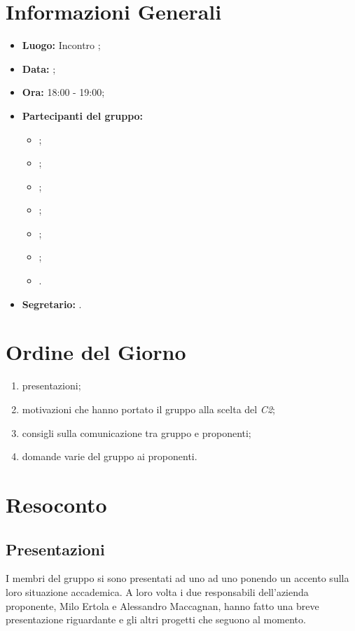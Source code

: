 \section{Informazioni Generali}
\begin{itemize}
\item \textbf{Luogo:} Incontro ;
\item \textbf{Data:} \Data;
\item \textbf{Ora:} 18:00 - 19:00;
\item \textbf{Partecipanti del gruppo:}
	\begin{itemize}
		\item \BL{}; 
		\item \FF{};
		\item \MM{}; 
		\item \PC{};
		\item \TG{};
		\item \TL{};
		\item \VD{}.
	\end{itemize} 
\item \textbf{Segretario:} \PC{}.
\end{itemize}

\section{Ordine del Giorno}
\begin{enumerate}
	\item presentazioni;
	\item motivazioni che hanno portato il gruppo {\Gruppo} alla scelta del  \textit{C2};
	\item consigli sulla comunicazione tra gruppo e proponenti;
	\item domande varie del gruppo ai proponenti.
\end{enumerate}

\section{Resoconto}
\subsection{Presentazioni}
I membri del gruppo {\Gruppo} si sono presentati ad uno ad uno ponendo un accento sulla loro situazione accademica. A loro volta i due responsabili dell'azienda proponente, Milo Ertola e Alessandro Maccagnan, hanno fatto una breve presentazione riguardante {\Proponente} e gli altri progetti che seguono al momento.

